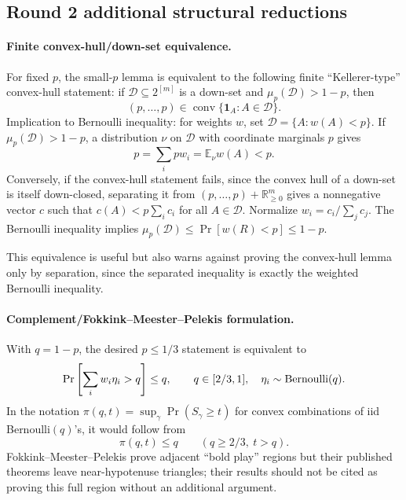 \documentclass[12pt]{article}
\begin{document}
\subsection*{Round 2 additional structural reductions}

\paragraph{Finite convex-hull/down-set equivalence.}
For fixed \(p\), the small-\(p\) lemma is equivalent to the following finite
``Kellerer-type'' convex-hull statement: if \(\mathcal D\subseteq 2^{[m]}\) is a
down-set and \(\mu_p(\mathcal D)>1-p\), then
\[
 (p,\ldots,p)\in\operatorname{conv}\{\mathbf 1_A:A\in\mathcal D\}.
\]
Implication to Bernoulli inequality: for weights \(w\), set
\(\mathcal D=\{A:w(A)<p\}\).  If \(\mu_p(\mathcal D)>1-p\), a distribution
\(\nu\) on \(\mathcal D\) with coordinate marginals \(p\) gives
\[
p=\sum_i p w_i=\mathbb E_\nu w(A)<p.
\]
Conversely, if the convex-hull statement fails, since the convex hull of a
down-set is itself down-closed, separating it from
\((p,\ldots,p)+\mathbb R_{\ge0}^m\) gives a nonnegative vector \(c\) such that
\(c(A)<p\sum_i c_i\) for all \(A\in\mathcal D\).  Normalize
\(w_i=c_i/\sum_j c_j\).  The Bernoulli inequality implies
\(\mu_p(\mathcal D)\le \Pr[w(R)<p]\le1-p\).

This equivalence is useful but also warns against proving the convex-hull lemma
only by separation, since the separated inequality is exactly the weighted
Bernoulli inequality.

\paragraph{Complement/Fokkink--Meester--Pelekis formulation.}
With \(q=1-p\), the desired \(p\le1/3\) statement is equivalent to
\[
 \Pr\left[\sum_i w_i\eta_i>q\right]\le q,
 \qquad q\in[2/3,1],\quad \eta_i\sim{\rm Bernoulli}(q).
\]
In the notation \(\pi(q,t)=\sup_\gamma\Pr(S_\gamma\ge t)\) for convex
combinations of iid Bernoulli\((q)\)'s, it would follow from
\[
 \pi(q,t)\le q\qquad(q\ge2/3,\ t>q).
\]
Fokkink--Meester--Pelekis prove adjacent ``bold play'' regions but their
published theorems leave near-hypotenuse triangles; their results should not be
cited as proving this full region without an additional argument.
\end{document}
